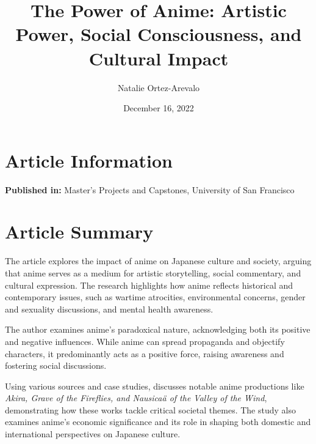 \documentclass[12pt]{article}
\title{\Large \textbf{The Power of Anime: Artistic Power, Social Consciousness, and Cultural Impact}}
\author{Natalie Ortez-Arevalo}
\date{December 16, 2022}
\begin{document}
\maketitle

\section*{Article Information}
\textbf{Published in:} Master's Projects and Capstones, University of San Francisco 

\section*{Article Summary}
The article explores the impact of anime on Japanese culture and society, arguing that anime serves as a medium for artistic storytelling, social commentary, and cultural expression. The research highlights how anime reflects historical and contemporary issues, such as wartime atrocities, environmental concerns, gender and sexuality discussions, and mental health awareness.

The author examines anime's paradoxical nature, acknowledging both its positive and negative influences. While anime can spread propaganda and objectify characters, it predominantly acts as a positive force, raising awareness and fostering social discussions.

Using various sources and case studies, \cite{ortez2022power} discusses notable anime productions like \textit{Akira, Grave of the Fireflies, and Nausicaä of the Valley of the Wind}, demonstrating how these works tackle critical societal themes. The study also examines anime's economic significance and its role in shaping both domestic and international perspectives on Japanese culture.



\end{document}
